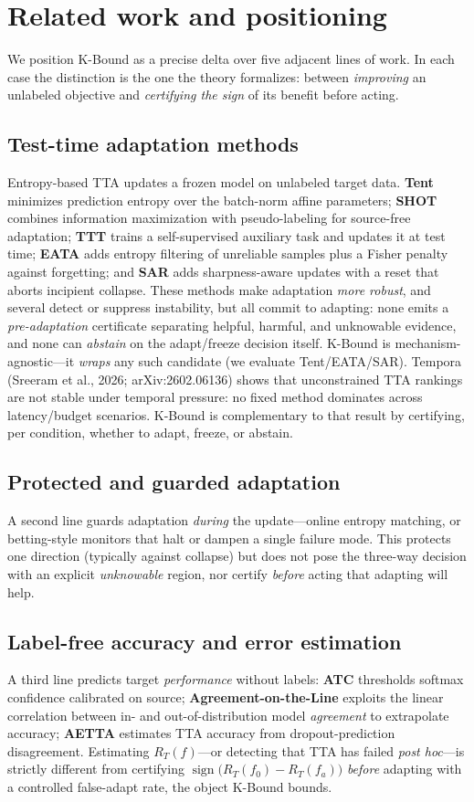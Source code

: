 \documentclass[11pt]{article}
\theoremstyle{plain}
\theoremstyle{definition}
\newcommand{\sign}{\operatorname{sign}}
\begin{document}
\section{Related work and positioning}
We position K-Bound as a precise delta over five adjacent lines of work. In each case the
distinction is the one the theory formalizes: between \emph{improving} an unlabeled objective
and \emph{certifying the sign} of its benefit before acting.

\subsection{Test-time adaptation methods}
Entropy-based TTA updates a frozen model on unlabeled target data. \textbf{Tent} minimizes
prediction entropy over the batch-norm affine parameters; \textbf{SHOT} combines information
maximization with pseudo-labeling for source-free adaptation; \textbf{TTT} trains a
self-supervised auxiliary task and updates it at test time; \textbf{EATA} adds entropy
filtering of unreliable samples plus a Fisher penalty against forgetting; and \textbf{SAR}
adds sharpness-aware updates with a reset that aborts incipient collapse. These methods make
adaptation \emph{more robust}, and several detect or suppress instability, but all commit to
adapting: none emits a \emph{pre-adaptation} certificate separating helpful, harmful, and
unknowable evidence, and none can \emph{abstain} on the adapt/freeze decision itself. K-Bound
is mechanism-agnostic---it \emph{wraps} any such candidate (we evaluate Tent/EATA/SAR).
Tempora (Sreeram et al., 2026; arXiv:2602.06136) shows that unconstrained TTA rankings are
not stable under temporal pressure: no fixed method dominates across latency/budget scenarios.
K-Bound is complementary to that result by certifying, per condition, whether to adapt, freeze,
or abstain.

\subsection{Protected and guarded adaptation}
A second line guards adaptation \emph{during} the update---online entropy matching, or
betting-style monitors that halt or dampen a single failure mode. This protects one direction
(typically against collapse) but does not pose the three-way decision with an explicit
\emph{unknowable} region, nor certify \emph{before} acting that adapting will help.

\subsection{Label-free accuracy and error estimation}
A third line predicts target \emph{performance} without labels: \textbf{ATC} thresholds
softmax confidence calibrated on source; \textbf{Agreement-on-the-Line} exploits the linear
correlation between in- and out-of-distribution model \emph{agreement} to extrapolate
accuracy; \textbf{AETTA} estimates TTA accuracy from dropout-prediction disagreement.
Estimating $R_T(f)$---or detecting that TTA has failed \emph{post hoc}---is strictly different
from certifying $\sign\big(R_T(f_0)-R_T(f_a)\big)$ \emph{before} adapting with a controlled
false-adapt rate, the object K-Bound bounds.
\end{document}
